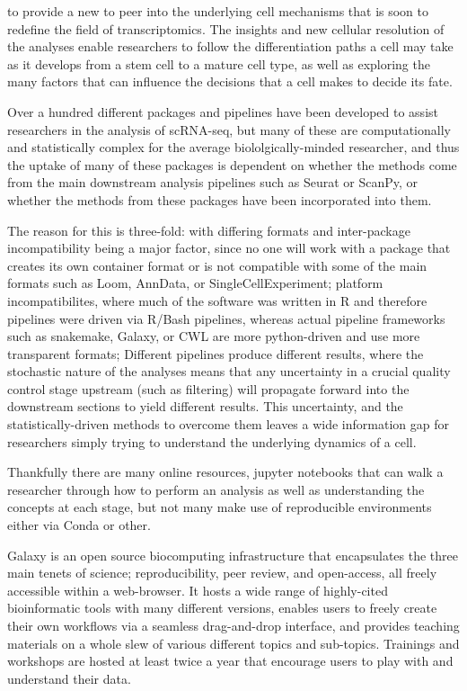 \documentclass[a4paper,num-refs]{oup-contemporary}
\begin{document}


to  provide a new  to peer into the underlying cell mechanisms that is soon to redefine the field of transcriptomics. The insights and new cellular resolution of the analyses enable researchers to follow the differentiation paths a cell may take as it develops from a stem cell to a mature cell type, as well as exploring the many factors that can influence the decisions that a cell makes to decide its fate.

Over a hundred different packages and pipelines have been developed to assist researchers in the analysis of scRNA-seq, but many of these are computationally and statistically complex for the average biololgically-minded researcher, and thus the uptake of many of these packages is dependent on whether the methods come from the main downstream analysis pipelines such as Seurat or ScanPy, or whether the methods from these packages have been incorporated into them.

The reason for this is three-fold: with differing formats and inter-package incompatibility being a major factor, since no one will work with a package that creates its own container format or is not compatible with some of the main formats such as Loom, AnnData, or SingleCellExperiment; platform incompatibilites, where much of the software was written in R and therefore pipelines were driven via R/Bash pipelines, whereas actual pipeline frameworks such as snakemake, Galaxy, or CWL are more python-driven and use more transparent formats; Different pipelines produce different results, where the stochastic nature of the analyses means that any uncertainty in a crucial quality control stage upstream (such as filtering) will propagate forward into the downstream sections to yield different results. This uncertainty, and the statistically-driven methods to overcome them leaves a wide information gap for researchers simply trying to understand the underlying dynamics of a cell.

Thankfully there are many online resources, jupyter notebooks that can walk a researcher through how to perform an analysis as well as understanding the concepts at each stage, but not many make use of reproducible environments either via Conda or other.

Galaxy is an open source biocomputing infrastructure that encapsulates the three main tenets of science; reproducibility, peer review, and open-access, all freely accessible within a web-browser. It hosts a wide range of highly-cited bioinformatic tools with many different versions, enables users to freely create their own workflows via a seamless drag-and-drop interface, and provides teaching materials on a whole slew of various different topics and sub-topics. Trainings and workshops are hosted at least twice a year that encourage users to play with and understand their data.
\end{document}

